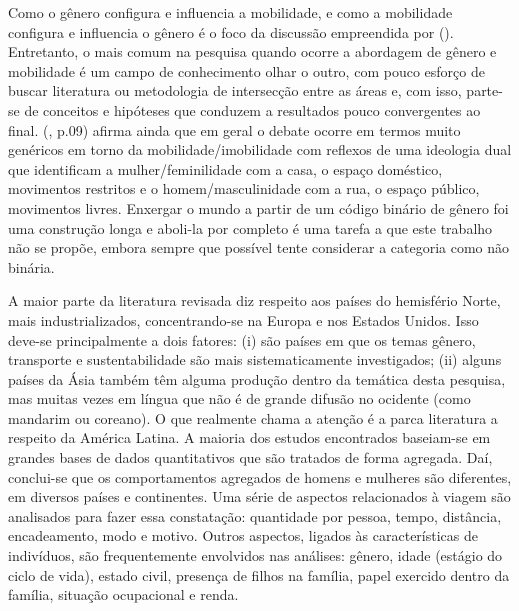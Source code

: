 
Como o gênero configura e influencia a mobilidade, e como a mobilidade configura e influencia o gênero é o foco da discussão empreendida por  (\citeyear{HANSON2010}). Entretanto, o mais comum na pesquisa quando ocorre a abordagem de gênero e mobilidade é um campo de conhecimento olhar o outro, com pouco esforço de buscar literatura ou metodologia de intersecção entre as áreas e, com isso, parte-se de conceitos e hipóteses que conduzem a resultados pouco convergentes ao final.  (\citeyear{HANSON2010}, p.09) afirma ainda que em geral o debate ocorre em termos muito genéricos em torno da mobilidade/imobilidade com reflexos de uma ideologia dual que identificam a mulher/feminilidade com a casa, o espaço doméstico, movimentos restritos e o homem/masculinidade com a rua, o espaço público, movimentos livres. Enxergar o mundo a partir de um código binário de gênero foi uma construção longa e aboli-la por completo é uma tarefa a que este trabalho não se propõe, embora sempre que possível tente considerar a categoria como não binária.

A maior parte da literatura revisada diz respeito aos países do hemisfério Norte, mais industrializados, concentrando-se na Europa e nos Estados Unidos. Isso deve-se principalmente a dois fatores: (i) são países em que os temas gênero, transporte e sustentabilidade são mais sistematicamente investigados; (ii) alguns países da Ásia também têm alguma produção dentro da temática desta pesquisa, mas muitas vezes em língua que não é de grande difusão no ocidente (como mandarim ou coreano). O que realmente chama a atenção é a parca literatura a respeito da América Latina. A maioria dos estudos encontrados baseiam-se em grandes bases de dados quantitativos que são tratados de forma agregada. Daí, conclui-se que os comportamentos agregados de homens e  mulheres são diferentes, em diversos países e continentes. Uma série de aspectos relacionados à viagem são analisados para fazer essa constatação: quantidade por pessoa, tempo, distância, encadeamento, modo e motivo. Outros aspectos, ligados às características de indivíduos, são frequentemente envolvidos nas análises: gênero, idade (estágio do ciclo de vida), estado civil, presença de filhos na família, papel exercido dentro da família, situação ocupacional e renda.



